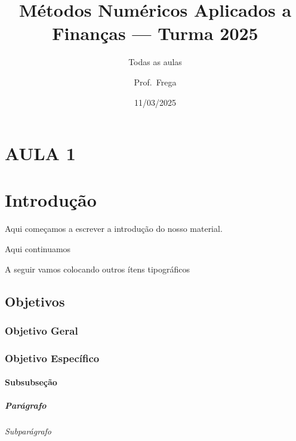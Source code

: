 \documentclass[
]{book}
\title{Métodos Numéricos Aplicados a Finanças --- Turma 2025}
\subtitle{Todas as aulas}
\author{Prof.~Frega}
\date{11/03/2025}
\begin{document}
\frontmatter
\maketitle

{
\setcounter{tocdepth}{5}
\tableofcontents
}
\mainmatter
\hypertarget{aula-1}{%
\chapter*{AULA 1}\label{aula-1}}

\hypertarget{introduuxe7uxe3o}{%
\chapter{Introdução}\label{introduuxe7uxe3o}}

Aqui começamos a escrever a introdução do nosso material.

Aqui continuamos

A seguir vamos colocando outros ítens tipográficos

\hypertarget{objetivos}{%
\section{Objetivos}\label{objetivos}}

\hypertarget{objetivo-geral}{%
\subsection{Objetivo Geral}\label{objetivo-geral}}

\hypertarget{objetivo-especuxedfico}{%
\subsection{Objetivo Específico}\label{objetivo-especuxedfico}}

\hypertarget{subsubseuxe7uxe3o}{%
\subsubsection{Subsubseção}\label{subsubseuxe7uxe3o}}

\hypertarget{paruxe1grafo}{%
\paragraph{Parágrafo}\label{paruxe1grafo}}

\hypertarget{subparuxe1grafo}{%
\subparagraph{Subparágrafo}\label{subparuxe1grafo}}
\end{document}
